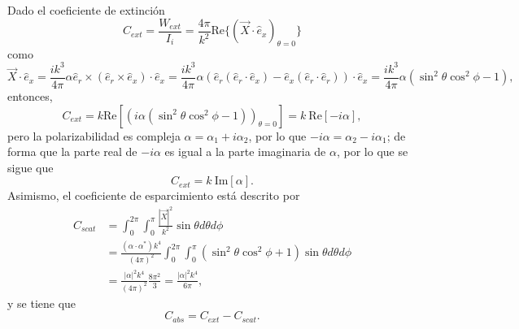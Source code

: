 Dado el coeficiente de extinción \cite{Bohren}
\begin{equation}
    C_{ext}=\frac{W_{ext}}{I_i}=\frac{4\pi}{k^2} \mbox{Re}\{(\Vec{X}\cdot\hat{e}_x)_{\theta=0}\}    
\end{equation}
como
\begin{equation}
    \Vec{X}\cdot\hat{e}_x=\frac{ik^3}{4\pi}\alpha \hat{e}_r\times(\hat{e}_r\times \hat{e}_x)\cdot\hat{e}_x=\frac{ik^3}{4\pi}\alpha\left(\hat{e}_r(\hat{e}_r\cdot \hat{e}_x)-\hat{e}_x(\hat{e}_r\cdot \hat{e}_r)\right)\cdot\hat{e}_x=\frac{ik^3}{4\pi}\alpha(\sin^2\theta\cos^2\phi-1),    
\end{equation}
entonces, 
\begin{equation}
    C_{ext}=k \mbox{Re}\left[\left(i\alpha(\sin^2\theta\cos^2\phi-1)\right)_{\theta=0}\right]=k\:\mbox{Re}\left[-i\alpha\right],
\end{equation}
pero la polarizabilidad es compleja $\alpha=\alpha_1+i\alpha_2$, por lo que $-i\alpha=\alpha_2-i\alpha_1$; de forma que la parte real de $-i\alpha$ es igual a la parte imaginaria de $\alpha$, por lo que se sigue que
\begin{equation}
    C_{ext}=k\: \mbox{Im}[\alpha].    
\end{equation}
Asimismo, el coeficiente de esparcimiento está descrito por \cite{Bohren}
\begin{align}
    C_{scat}&=\int_{0}^{2\pi}\int_0^{\pi}\frac{|\Vec{X}|^2}{k^2}\sin\theta d\theta d\phi\nonumber\\
    &=\frac{(\alpha\cdot\alpha^*)k^4}{(4\pi)^2}\int_0^{2\pi}\int_0^{\pi}(\sin^2\theta\cos^2\phi+1)\sin\theta d\theta d\phi\nonumber\\
    &=\frac{|\alpha|^2k^4}{(4\pi)^2}\frac{8\pi^2}{3}=\frac{|\alpha|^2k^4}{6\pi},
\end{align}
y se tiene que \cite{Bohren}
\begin{equation}
    C_{abs}=C_{ext}-C_{scat}.    
\end{equation}
